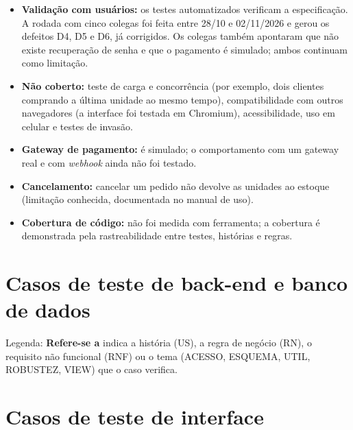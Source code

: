 \documentclass[12pt]{article}
\begin{document}
\begin{itemize}
\item \textbf{Validação com usuários:} os testes automatizados verificam a especificação. A rodada com cinco colegas foi feita entre 28/10 e 02/11/2026 e gerou os defeitos D4, D5 e D6, já corrigidos. Os colegas também apontaram que não existe recuperação de senha e que o pagamento é simulado; ambos continuam como limitação.
\item \textbf{Não coberto:} teste de carga e concorrência (por exemplo, dois clientes comprando a última unidade ao mesmo tempo), compatibilidade com outros navegadores (a interface foi testada em Chromium), acessibilidade, uso em celular e testes de invasão.
\item \textbf{Gateway de pagamento:} é simulado; o comportamento com um gateway real e com \textit{webhook} ainda não foi testado.
\item \textbf{Cancelamento:} cancelar um pedido não devolve as unidades ao estoque (limitação conhecida, documentada no manual de uso).
\item \textbf{Cobertura de código:} não foi medida com ferramenta; a cobertura é demonstrada pela rastreabilidade entre testes, histórias e regras.
\end{itemize}

\newpage
\appendix
\section{Casos de teste de back-end e banco de dados}

Legenda: \textbf{Refere-se a} indica a história (US), a regra de negócio (RN), o requisito não funcional (RNF) ou o tema (ACESSO, ESQUEMA, UTIL, ROBUSTEZ, VIEW) que o caso verifica.



\newpage
\section{Casos de teste de interface}


\end{document}

